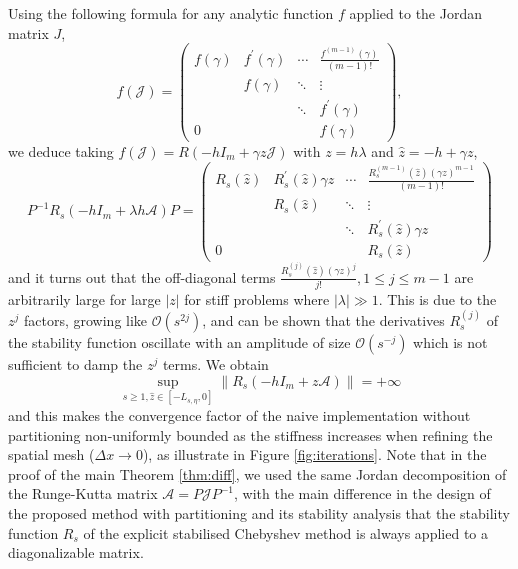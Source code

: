 \documentclass[10pt,a4paper]{article}
\newcommand{\bigo}{\mathcal{O}}
\def \calA{\mathcal{A}}
\def \calJ{\mathcal{J}}
\begin{document}
Using the following formula for any analytic function $f$ applied to the Jordan matrix $J$,
        $$
f(\calJ)=\begin{pmatrix}f(\gamma)&f^\prime(\gamma)&\cdots&\frac{f^{(m-1)}(\gamma)}{(m-1)!}\\&f(\gamma)&\ddots&\vdots\\&&\ddots&f^\prime(\gamma)\\0&&&f(\gamma)\end{pmatrix},
        $$
        we deduce taking $f(\calJ)=R(-hI_m+\gamma z \calJ)$ with $z=h\lambda$ and $\hat z=-h+\gamma z$,
$$
P^{-1}R_s(-hI_m +\lambda h \mathcal{A})P = \begin{pmatrix}
R_s(\hat z)&R_s^\prime(\hat z) \gamma z&\cdots& \frac{R_s^{(m-1)}(\hat z)(\gamma z)^{m-1}}{(m-1)!} \\&R_s(\hat z)&\ddots&\vdots\\&&\ddots&R_s^\prime(\hat z) \gamma z\\0&&&R_s(\hat z)
\end{pmatrix}
$$
and it turns out that the off-diagonal terms $\frac{R_s^{(j)}(\hat z)(\gamma z)^{j}}{j!}, 1\leq j\leq m-1$ are arbitrarily large for large $|z|$ for stiff problems where $|\lambda| \gg 1$. 
This is due to the $z^j$ factors, growing like $\bigo(s^{2j})$, and can be shown that the 
derivatives $R_s^{(j)}$ of the stability function oscillate with an amplitude of size $\bigo(s^{-j})$ which is not sufficient to damp the $z^j$ terms.
We obtain  
$$\sup_{s\geq 1, \hat z\in [-L_{s,\eta},0]} \|R_s(-hI_m+z \mathcal A)\|=+\infty$$
and this makes the convergence factor of the naive implementation without partitioning non-uniformly bounded 
as the stiffness increases when refining the spatial mesh ($\Delta x\rightarrow 0$), as illustrate in Figure \ref{fig:iterations}.
Note that in the proof of the main Theorem \ref{thm:diff}, we used the same Jordan decomposition of the Runge-Kutta matrix
$
\calA = P\mathcal{J}P^{-1}
$, with the main difference in the design of the proposed method with partitioning and its stability analysis that the stability function $R_s$ of the explicit stabilised Chebyshev method is always applied to a diagonalizable matrix.

	
\end{document}
